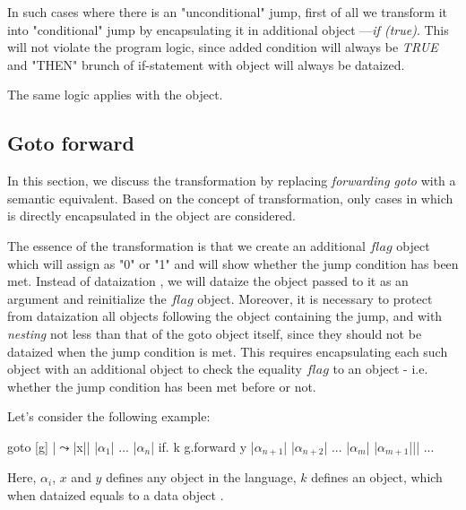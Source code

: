 \documentclass[sigplan,review,11pt,nonacm,natbib=false]{acmart}
\theoremstyle{theorems}
\begin{document}
    In such cases where there is an "unconditional" jump, first of all we transform it into "conditional" jump by encapsulating it in additional object ---\emph{if (true)}.
    This will not violate the program logic, since added condition will always be \emph{TRUE} and "THEN" brunch of if-statement with object  will always be dataized.

    The same logic applies with the  object.





    \subsection{Goto forward} \label{GF}
    In this section, we discuss the transformation by replacing \emph{forwarding goto} with a semantic equivalent.
    Based on the concept of transformation, only cases in which  is directly encapsulated in the object  are considered.

    The essence of the transformation is that we create an additional $flag$ object which will assign as "0" or "1" and will show whether the jump condition has been met.
    Instead of dataization , we will dataize the object passed to it as an argument and reinitialize the $flag$ object.
    Moreover, it is necessary to protect from dataization all objects following the  object containing the jump, and with \emph{nesting} not less than that of the goto object itself, since they should not be dataized when the jump condition is met.
    This requires encapsulating each such object with an additional object  to check the equality $flag$ to an object  - i.e. whether the jump condition has been met before or not.

    Let's consider the following example:
    \begin{ffcode}
        goto
        [g]
        |$\leadsto$|x|$\label{ln:of0}$|
        |$\alpha_1$|
        ...
        |$\alpha_n$|
        if.
        k
        g.forward y
        |$\alpha_{n+1}$|
        |$\alpha_{n+2}$|
        ...
        |$\alpha_{m}$|
        |$\alpha_{m+1}$||$\label{ln:of1}$|
        ...
    \end{ffcode}
    Here, $\alpha_i$, $x$ and $y$ defines any object in the language, $k$ defines an object, which when dataized equals to a data object .
\end{document}
